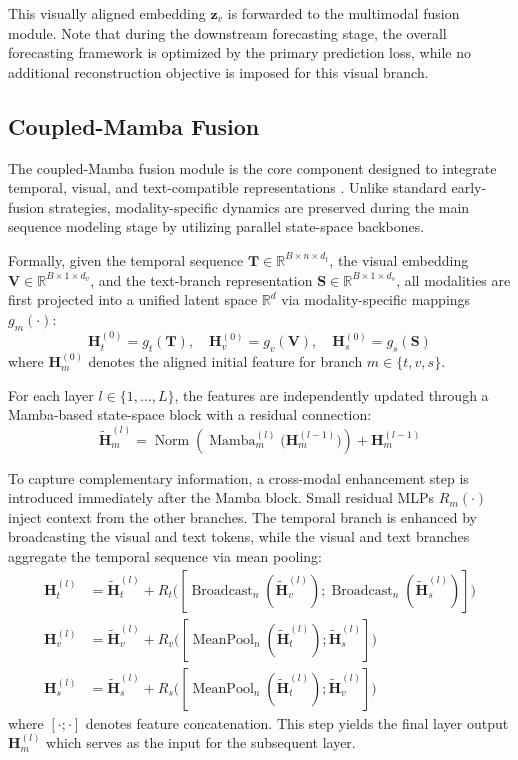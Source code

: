 \documentclass[journal]{IEEEtran}
\begin{document}
This visually aligned embedding $\mathbf{z}_v$ is forwarded to the multimodal fusion module. Note that during the downstream forecasting stage, the overall forecasting framework is optimized by the primary
prediction loss, while no additional reconstruction objective is imposed for this visual branch.
\subsection{Coupled-Mamba Fusion}

The coupled-Mamba fusion module is the core component designed to integrate temporal, visual, and text-compatible representations \cite{li2024coupled,gu2023mamba}. Unlike standard early-fusion strategies, modality-specific dynamics are preserved during the main sequence modeling stage by utilizing parallel state-space backbones.

Formally, given the temporal sequence $\mathbf{T} \in \mathbb{R}^{B \times n \times d_t}$, the visual embedding $\mathbf{V} \in \mathbb{R}^{B \times 1 \times d_v}$, and the text-branch representation $\mathbf{S} \in \mathbb{R}^{B \times 1 \times d_s}$, all modalities are first projected into a unified latent space $\mathbb{R}^{d}$ via modality-specific mappings $g_m(\cdot)$:
\begin{equation}
\mathbf{H}_t^{(0)} = g_t(\mathbf{T}), \quad \mathbf{H}_v^{(0)} = g_v(\mathbf{V}), \quad \mathbf{H}_s^{(0)} = g_s(\mathbf{S})
\end{equation}
where $\mathbf{H}_m^{(0)}$ denotes the aligned initial feature for branch $m \in \{t,v,s\}$.

For each layer $l \in \{1,\dots,L\}$, the features are independently updated through a Mamba-based state-space block with a residual connection:
\begin{equation}
\tilde{\mathbf{H}}_m^{(l)} = \operatorname{Norm}\left(\operatorname{Mamba}_m^{(l)}\big(\mathbf{H}_m^{(l-1)}\big)\right) + \mathbf{H}_m^{(l-1)}
\end{equation}

To capture complementary information, a cross-modal enhancement step is introduced immediately after the Mamba block. Small residual MLPs $R_m(\cdot)$ inject context from the other branches. The temporal branch is enhanced by broadcasting the visual and text tokens, while the visual and text branches aggregate the temporal sequence via mean pooling:
\begin{align}
\mathbf{H}_t^{(l)} &= \tilde{\mathbf{H}}_t^{(l)} + R_t\big([\operatorname{Broadcast}_{n}(\tilde{\mathbf{H}}_v^{(l)}); \operatorname{Broadcast}_{n}(\tilde{\mathbf{H}}_s^{(l)})]\big) \\
\mathbf{H}_v^{(l)} &= \tilde{\mathbf{H}}_v^{(l)} + R_v\big([\operatorname{MeanPool}_{n}(\tilde{\mathbf{H}}_t^{(l)}); \tilde{\mathbf{H}}_s^{(l)}]\big) \\
\mathbf{H}_s^{(l)} &= \tilde{\mathbf{H}}_s^{(l)} + R_s\big([\operatorname{MeanPool}_{n}(\tilde{\mathbf{H}}_t^{(l)}); \tilde{\mathbf{H}}_v^{(l)}]\big)
\end{align}
where $[\cdot;\cdot]$ denotes feature concatenation. This step yields the final layer output $\mathbf{H}_m^{(l)}$ which serves as the input for the subsequent layer.
\end{document}
